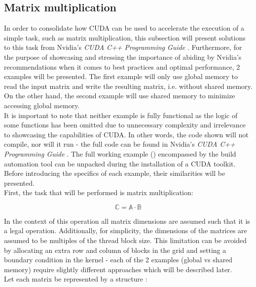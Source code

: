 \subsection{Matrix multiplication \TO}\label{Subsection:matrix-multiplication}
In order to consolidate how CUDA can be used to accelerate the execution of a simple task, such as matrix multiplication, this subsection will present solutions to this task from Nvidia's \emph{CUDA C++ Programming Guide} \cite{NVIDIAMay2022}. Furthermore, for the purpose of showcasing and stressing the importance of abiding by Nvidia's recommendations when it comes to best practices and optimal performance, 2 examples will be presented. The first example will only use global memory to read the input matrix and write the resulting matrix, i.e. without shared memory. On the other hand, the second example will use shared memory to minimize accessing global memory. \\
It is important to note that neither example is fully functional as the logic of some functions has been omitted due to unnecessary complexity and irrelevance to showcasing the capabilities of CUDA. In other words, the code shown will not compile, nor will it run - the full code can be found in Nvidia's \emph{CUDA C++ Programming Guide} \cite{NVIDIAMay2022}. The full working example () encompassed by the build automation tool  can be unpacked during the installation of a CUDA toolkit. \\
Before introducing the specifics of each example, their similarities will be presented. \\
First, the task that will be performed is matrix multiplication:

\begin{equation}\label{Equation:matrix-multiplication-definition}
	\mathbb{C} = \mathbb{A} \cdot \mathbb{B}
\end{equation}

In the context of this operation all matrix dimensions are assumed such that it is a legal operation. Additionally, for simplicity, the dimensions of the matrices are assumed to be multiples of the thread block size. This limitation can be avoided by allocating an extra row and column of blocks in the grid and setting a boundary condition in the kernel - each of the 2 examples (global vs shared memory) require slightly different approaches which will be described later. \\
Let each matrix be represented by a structure :

